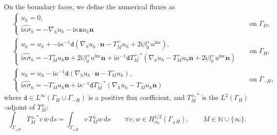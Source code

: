 \documentclass[a4paper,10pt]{article}
\newcommand{\IN}{{\mathbb N}}
\newcommand{\bn}{{\mathbf n}}
\newcommand{\ri}{{\mathrm i}}
\newcommand{\rd}{{\,\mathrm d}}
\newcommand{\inc}{{\mathrm{inc}}}
\newcommand{\pa}{{\mathtt{a}}}
\newcommand{\pd}{{\mathtt{d}}}
\newcommand{\cw}{{\overline{w}}}
\newcommand{\GD}{{\Gamma_D}}
\newcommand{\GH}{{\Gamma_H}}
\newcommand{\GmH}{{\Gamma_{-H}}}
\newcommand{\GpmH}{{\Gamma_{\pm H}}}
\begin{document}
On the boundary faces, we define the numerical fluxes as
\begin{align*}
& \begin{cases}
	\hat{u}_h = 0, & \\
	\widehat{\ri\kappa \sigma}_h = - \nabla_h u_h - \ri \kappa \pa u_h \bn &  
\end{cases} & \text{on }\GD, \\
& \begin{cases}
	\hat{u}_h = u_h + -\ri\kappa^{-1}\pd\left(\nabla_h  u_h \cdot \bn - T_M^+ u_h + 2\ri\beta_0^+ u^\inc \right), & \\
	\widehat{\ri \kappa \sigma}_h = -  T_M^+ u_h \bn + 2\ri\beta_0^+ u^\inc \bn 
	+\ri\kappa^{-1}\pd T^{+,*}_M \left( \nabla_h  u_h -T_M^+ u_h \bn + 2\ri\beta_0^+ u^\inc \bn \right) &
\end{cases} & \text{on }\GH, \\
& \begin{cases}
	\hat{u}_h = u_h -\ri\kappa^{-1}\pd\left( \nabla_h  u_h \cdot \bn - T_M^- u_h \right), & \\
	\widehat{\ri \kappa \sigma}_h = - T_M^- u_h \bn +\ri\kappa^{-1}\pd T^{-,*}_M \left( \nabla_h  u_h -T_M^- u_h \bn \right) &
\end{cases} &\text{on }\GmH,
\end{align*}
where $\pd \in L^\infty(\GH\cup\GmH)$ is a positive flux coefficient, and $T^{\pm,*}_M$ is the $L^2(\GH)$-adjoint of $T^\pm_M$:
\begin{equation*}
\int_\GpmH T^{\pm,*}_M v \, \cw \rd s
= \int_\GpmH v \, \overline{T^\pm_M w} \rd s
\qquad \forall v,w\in H^{1/2}_{\alpha_0}(\GpmH), \qquad M \in \IN \cup \{\infty\}.
\end{equation*}
\end{document}
